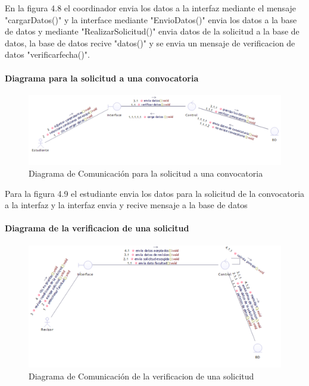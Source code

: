 En la figura 4.8 el coordinador  envia los datos a la interfaz mediante el mensaje "cargarDatos()" y la interface mediante "EnvioDatos()" envia los datos a la base de datos y mediante "RealizarSolicitud()" envia datos de la solicitud a la base de datos, la base de datos recive "datos()" y se envia un mensaje de verificacion de datos "verificarfecha()".

\paragraph{Diagrama para la solicitud a una convocatoria}
\begin{figure}[H]
	\centering
	\includegraphics[width=1\linewidth]{parte2/imgs/DiagramaComunicacion/ComSoliConv}
	\caption[Diagrama de Comunicacion Solicitud a Convocatoria]{Diagrama de Comunicación para la solicitud a una convocatoria}
	\label{fig:diagramaDeComunicacion2}
\end{figure}

Para la figura 4.9  el estudiante envia los datos para la solicitud de la convocatoria a la interfaz y la interfaz envia y recive mensaje a la base de datos

\paragraph{Diagrama de la verificacion de una solicitud}
\begin{figure}[H]
	\centering
	\includegraphics[width=1\linewidth]{parte2/imgs/DiagramaComunicacion/ComVer}
	\caption[Diagrama de Comunicacion verificacion solicitud]{Diagrama de Comunicación de la  verificacion de una solicitud}
	\label{fig:diagramaDeComunicacion4}
\end{figure}

